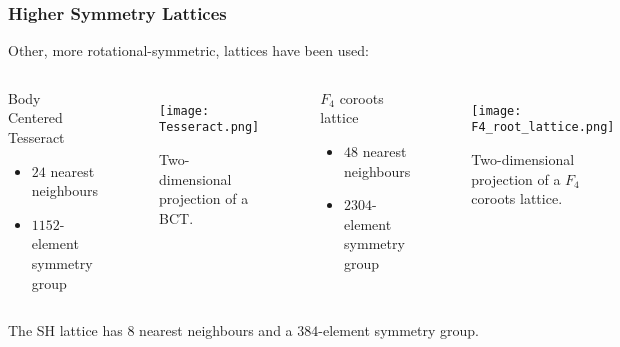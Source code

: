 \documentclass{beamer}
\begin{document}
\begin{frame}
  \frametitle{Higher Symmetry Lattices}
  Other, more rotational-symmetric, lattices have been used:\\
  \begin{columns}
    \centering
      \begin{block}{\centering
        Body Centered Tesseract \cite{Celmaster:1982ht}
        }
        \begin{itemize}
          \item $24$ nearest neighbours
          \item $1152$-element symmetry group
        \end{itemize}
      \end{block}
      \begin{figure}
        \texttt{[image: Tesseract.png]}
        \caption{Two-dimensional projection of a BCT. \cite{Celmaster:1982ht}}
      \end{figure}
    
    \centering
      \begin{block}{\centering
          $F_4$ coroots lattice \cite{Neuberger:1987kt}
          }
          \begin{itemize}
            \item $48$ nearest neighbours
            \item $2304$-element symmetry group
          \end{itemize}
        \end{block}
      \begin{figure}
        \texttt{[image: F4\_root\_lattice.png]}
        \caption{Two-dimensional projection of a $F_4$ coroots lattice. \cite{f4image}}
      \end{figure}
  \end{columns}
  \footnotesize
  The SH lattice has $8$ nearest neighbours and a $384$-element symmetry group.
\end{frame}
\end{document}
